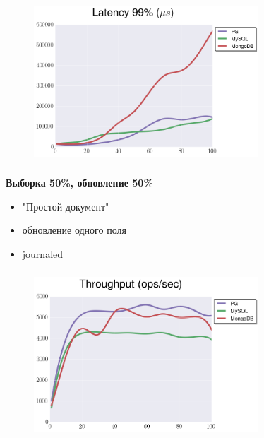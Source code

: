 \documentclass[usenames,dvipsnames, 18pt, compress, aspectratio=169]{beamer}
\begin{document}
\begin{frame}
    \frametitle{}
    \begin{center}
    \begin{figure}
        \includegraphics[width=0.75\textwidth,center]{benchmarks/update_btree_transaction_sync_latency.png}
    \end{figure}
    \end{center}
\end{frame}

\begin{frame}
    \frametitle{}
    \begin{center}
        \textbf{Выборка 50\%, обновление 50\%}
        \begin{itemize}[label={}]
            \item "Простой документ"
            \item обновление одного поля
            \item journaled
        \end{itemize}
    \end{center}
\end{frame}

\begin{frame}
    \frametitle{}
    \begin{center}
    \begin{figure}
        \includegraphics[width=0.75\textwidth,center]{benchmarks/update_btree_journaled_throughput.png}
    \end{figure}
    \end{center}
\end{frame}
\end{document}
